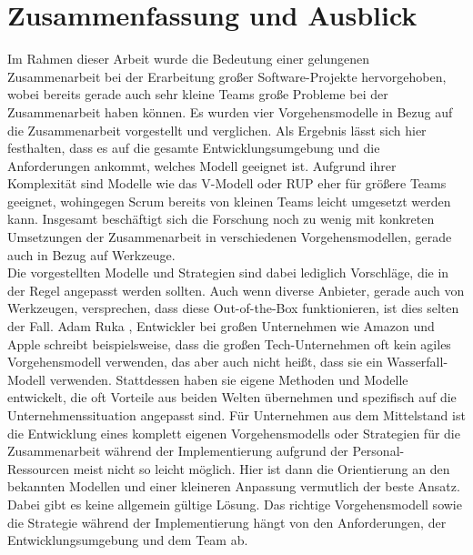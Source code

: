 
\section{Zusammenfassung und Ausblick}
\label{sec:fazit}



Im Rahmen dieser Arbeit wurde die Bedeutung einer gelungenen Zusammenarbeit bei der Erarbeitung großer Software-Projekte hervorgehoben, wobei  bereits gerade auch sehr kleine Teams große Probleme bei der Zusammenarbeit haben können. Es wurden vier Vorgehensmodelle in Bezug auf die Zusammenarbeit vorgestellt und verglichen. Als Ergebnis lässt sich hier festhalten, dass es auf die gesamte Entwicklungsumgebung und die Anforderungen ankommt, welches Modell geeignet ist. Aufgrund ihrer Komplexität sind Modelle wie das V-Modell oder RUP eher für größere Teams geeignet, wohingegen Scrum bereits von kleinen Teams leicht umgesetzt werden kann. Insgesamt beschäftigt sich die Forschung noch zu wenig mit konkreten Umsetzungen der Zusammenarbeit in verschiedenen Vorgehensmodellen, gerade auch in Bezug auf Werkzeuge.
\\
Die vorgestellten Modelle und Strategien sind dabei lediglich Vorschläge, die in der Regel angepasst werden sollten. Auch wenn diverse Anbieter, gerade auch von Werkzeugen, versprechen, dass diese Out-of-the-Box funktionieren, ist dies selten der Fall. Adam Ruka \cite{Ruka:2022:Big-Tech:06}, Entwickler bei großen Unternehmen wie Amazon und Apple schreibt beispielsweise, dass die großen Tech-Unternehmen oft kein agiles Vorgehensmodell verwenden, das aber auch nicht heißt, dass sie ein Wasserfall-Modell verwenden. Stattdessen haben sie eigene Methoden und Modelle entwickelt, die oft Vorteile aus beiden Welten übernehmen und spezifisch auf die Unternehmenssituation angepasst sind.
Für Unternehmen aus dem Mittelstand ist die Entwicklung eines komplett eigenen Vorgehensmodells oder Strategien für die Zusammenarbeit während der Implementierung aufgrund der Personal-Ressourcen meist nicht so leicht möglich. Hier ist dann die Orientierung an den bekannten Modellen und einer kleineren Anpassung vermutlich der beste Ansatz. Dabei gibt es keine allgemein gültige Lösung. Das richtige Vorgehensmodell sowie die Strategie während der Implementierung hängt von den Anforderungen, der Entwicklungsumgebung und dem Team ab.


